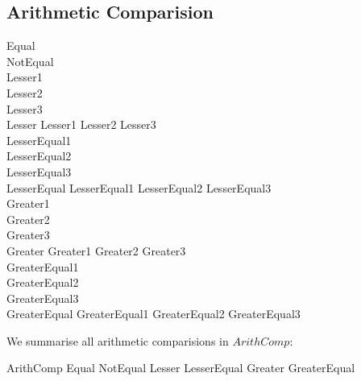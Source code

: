 \documentclass{article}
\begin{document}
\subsection{Arithmetic Comparision}
\begin{zed}
  Equal \\
  NotEqual \\  
  \also
  Lesser1 \\
  Lesser2 \\
  Lesser3 \\
  Lesser  Lesser1 \land Lesser2 \land Lesser3\\
  \also
  LesserEqual1 \\
  LesserEqual2 \\
  LesserEqual3 \\
  LesserEqual  LesserEqual1 \land LesserEqual2 \land LesserEqual3\\    
  \also
  Greater1 \\
  Greater2 \\
  Greater3 \\
  Greater  Greater1 \land Greater2 \land Greater3\\
  \also
  GreaterEqual1 \\
  GreaterEqual2 \\
  GreaterEqual3 \\
  GreaterEqual  GreaterEqual1 \land GreaterEqual2 \land GreaterEqual3\\
\end{zed}
We summarise all arithmetic comparisions in $ArithComp$:
\begin{zed}
  ArithComp  Equal \land NotEqual \land Lesser \land LesserEqual \land Greater \land GreaterEqual\\
\end{zed}
\end{document}
